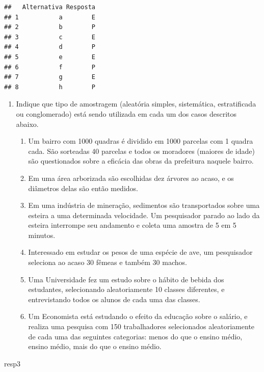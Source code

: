 \documentclass[]{article}
\newenvironment{Shaded}{\begin{snugshade}}{\end{snugshade}}
\newcommand{\NormalTok}[1]{#1}
\providecommand{\tightlist}{%
  \setlength{\itemsep}{0pt}\setlength{\parskip}{0pt}}
\begin{document}
\begin{verbatim}
##   Alternativa Resposta
## 1           a        E
## 2           b        P
## 3           c        E
## 4           d        P
## 5           e        E
## 6           f        P
## 7           g        E
## 8           h        P
\end{verbatim}

\begin{enumerate}
\def\labelenumi{\arabic{enumi}.}
\setcounter{enumi}{2}
\tightlist
\item
  Indique que tipo de amostragem (aleatória simples, sistemática,
  estratificada ou conglomerado) está sendo utilizada em cada um dos
  casos descritos abaixo.

  \begin{enumerate}
  \def\labelenumii{(\alph{enumii})}
  \tightlist
  \item
    Um bairro com 1000 quadras é dividido em 1000 parcelas com 1 quadra
    cada. São sorteadas 40 parcelas e todos os moradores (maiores de
    idade) são questionados sobre a eficácia das obras da prefeitura
    naquele bairro.
  \item
    Em uma área arborizada são escolhidas dez árvores ao acaso, e os
    diâmetros delas são então medidos.
  \item
    Em uma indústria de mineração, sedimentos são transportados sobre
    uma esteira a uma determinada velocidade. Um pesquisador parado ao
    lado da esteira interrompe seu andamento e coleta uma amostra de 5
    em 5 minutos.
  \item
    Interessado em estudar os pesos de uma espécie de ave, um
    pesquisador seleciona ao acaso 30 fêmeas e também 30 machos.
  \item
    Uma Universidade fez um estudo sobre o hábito de bebida dos
    estudantes, selecionando aleatoriamente 10 classes diferentes, e
    entrevistando todos os alunos de cada uma das classes.
  \item
    Um Economista está estudando o efeito da educação sobre o salário, e
    realiza uma pesquisa com 150 trabalhadores selecionados
    aleatoriamente de cada uma das seguintes categorias: menos do que o
    ensino médio, ensino médio, mais do que o ensino médio.
  \end{enumerate}
\end{enumerate}

\begin{Shaded}
\begin{Highlighting}[]
\NormalTok{resp3}
\end{Highlighting}
\end{Shaded}
\end{document}

